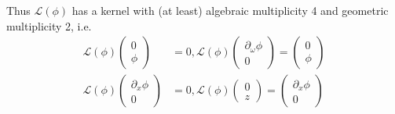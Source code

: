 \documentclass[12pt]{article}
\def\calL{{\mathcal L}}
\begin{document}
Thus $\calL(\phi)$ has a kernel with (at least) algebraic multiplicity 4 and geometric multiplicity 2, i.e.
\begin{align*}
\calL(\phi)\begin{pmatrix}0 \\ \phi \end{pmatrix} &= 0, 
\calL(\phi)\begin{pmatrix} \partial_\omega \phi \\ 0 \end{pmatrix} = \begin{pmatrix}0 \\ \phi \end{pmatrix} \\
\calL(\phi)\begin{pmatrix}\partial_x\phi \\ 0 \end{pmatrix} &= 0, 
\calL(\phi)\begin{pmatrix} 0 \\ z \end{pmatrix} = \begin{pmatrix}\partial_x\phi \\ 0 \end{pmatrix} 
\end{align*}
\end{document}

